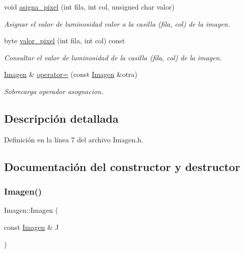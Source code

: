 \begin{DoxyCompactItemize}
void \hyperlink{classImagen_abe7e36244d80a6ed5ebf952c557203d3}{asigna\+\_\+pixel} (int fila, int col, unsigned char valor)
\begin{DoxyCompactList}\small\item\em Asignar el valor de luminosidad valor a la casilla (fila, col) de la imagen. \end{DoxyCompactList}\item 
byte \hyperlink{classImagen_a7d9378695a7fd2dce8092f180e716229}{valor\+\_\+pixel} (int fila, int col) const
\begin{DoxyCompactList}\small\item\em Consultar el valor de luminosidad de la casilla (fila, col) de la imagen. \end{DoxyCompactList}\item 
\hyperlink{classImagen}{Imagen} \& \hyperlink{classImagen_aa8bdc0191ef1b952a6405273edf3f3c8}{operator=} (const \hyperlink{classImagen}{Imagen} \&otra)
\begin{DoxyCompactList}\small\item\em Sobrecarga operador asognacion. \end{DoxyCompactList}\end{DoxyCompactItemize}


\subsection{Descripción detallada}


Definición en la línea 7 del archivo Imagen.\+h.



\subsection{Documentación del constructor y destructor}
\mbox{\label{classImagen_a70437d2848ae5b030ee17cf79651a8b5}} 
\subsubsection{\texorpdfstring{Imagen()}{Imagen()}\hspace{0.1cm}{\footnotesize\ttfamily [1/2]}}
{\footnotesize\ttfamily Imagen\+::\+Imagen (\begin{DoxyParamCaption}\item[{const \hyperlink{classImagen}{Imagen} \&}]{J }\end{DoxyParamCaption})}



